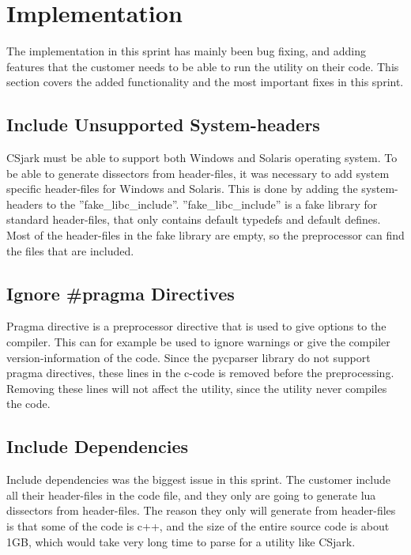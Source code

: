 \section{Implementation}
\label{sec:sp4impl}

The implementation in this sprint has mainly been bug fixing, and adding 
features that the customer needs to be able to run the \gls{utility} on their code. 
This section covers the added functionality and the most important fixes 
in this sprint.

\subsection{Include Unsupported System-\glspl{header}}
CSjark must be able to support both Windows and Solaris operating system. To 
be able to generate dissectors from header-files, it was necessary to add 
system specific header-files for Windows and Solaris. This is done by adding 
the system-headers to the ''fake\_libc\_include''. ''fake\_libc\_include'' is 
a fake library for standard header-files, that only contains default typedefs 
and default defines. Most of the header-files in the fake library are empty, 
so the preprocessor can find the files that are included.

\subsection{Ignore \#pragma Directives}
Pragma directive is a \gls{preprocessor} directive that is used to give options to 
the compiler. This can for example be used to ignore warnings or give the 
compiler version-information of the code. Since the pycparser \gls{library} do not 
support pragma directives, these lines in the \Gls{c}-code is removed before the 
preprocessing. Removing these lines will not affect the \gls{utility}, since the 
\gls{utility} never compiles the code.

\subsection{Include Dependencies}
Include dependencies was the biggest issue in this sprint. The customer 
include all their \gls{header}-files in the code file, and they only are going to 
generate \Gls{lua} \glspl{dissector} from \gls{header}-files. The reason they only will generate 
from \gls{header}-files is that some of the code is \gls{c++}, and the size of the entire 
source code is about 1GB, which would take very long time to parse for a 
\gls{utility} like CSjark. 


